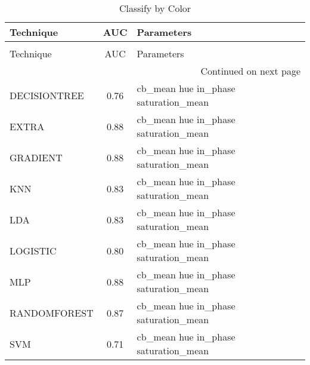 \begin{longtable}{lcl}
\caption[Classify by Color]{Classify by Color}
\label{table:results-color}\\
\toprule
   Technique &  AUC &                           Parameters \\
\midrule
\endfirsthead
\caption[]{Classify by Color} \\
\toprule
   Technique &  AUC &                           Parameters \\
\midrule
\endhead
\midrule
\multicolumn{3}{r}{{Continued on next page}} \\
\midrule
\endfoot

\bottomrule
\endlastfoot
DECISIONTREE & 0.76 & cb\_mean hue in\_phase saturation\_mean \\
       EXTRA & 0.88 & cb\_mean hue in\_phase saturation\_mean \\
    GRADIENT & 0.88 & cb\_mean hue in\_phase saturation\_mean \\
         KNN & 0.83 & cb\_mean hue in\_phase saturation\_mean \\
         LDA & 0.83 & cb\_mean hue in\_phase saturation\_mean \\
    LOGISTIC & 0.80 & cb\_mean hue in\_phase saturation\_mean \\
         MLP & 0.88 & cb\_mean hue in\_phase saturation\_mean \\
RANDOMFOREST & 0.87 & cb\_mean hue in\_phase saturation\_mean \\
         SVM & 0.71 & cb\_mean hue in\_phase saturation\_mean \\
\end{longtable}
